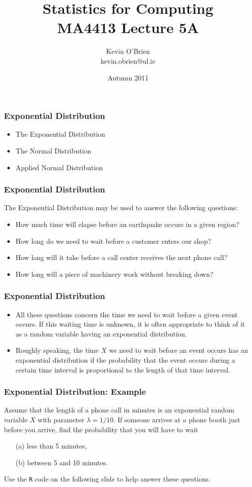 \documentclass[a4]{beamer}
\title[MA4413]{Statistics for Computing \\ {\normalsize MA4413 Lecture 5A}}
\author[Kevin O'Brien]{Kevin O'Brien \\ {\scriptsize kevin.obrien@ul.ie}}
\date{Autumn 2011}
\institute[Maths \& Stats]{Dept. of Mathematics \& Statistics, \\ University \textit{of} Limerick}
\begin{document}
\begin{frame}
\titlepage
\end{frame}
\begin{frame}[fragile]
\frametitle{Exponential Distribution}
\begin{itemize}
\item The Exponential Distribution
\item The Normal Distribution
\item Applied Normal Distribution
\end{itemize}
\end{frame}

\begin{frame}[fragile]
\frametitle{Exponential Distribution}
The Exponential Distribution may be used to answer the following questions:
\begin{itemize}
\item How much time will elapse before an earthquake occurs in a given region?
\item How long do we need to wait before a customer enters our shop?
\item How long will it take before a call center receives the next phone call?
\item How long will a piece of machinery work without breaking down?
\end{itemize}
\end{frame}  

\begin{frame}[fragile]
\frametitle{Exponential Distribution}

\begin{itemize}
\item All these questions concern the time we need to wait before a given event occurs. If this waiting time is unknown, it is often appropriate to think of it as a random variable having an exponential distribution.
\item Roughly speaking, the time $X$ we need to wait before an event occurs has an exponential distribution if the probability that the event occurs during a certain time interval is proportional to the length of that time interval.

\end{itemize}
\end{frame}

\begin{frame}[fragile]
\frametitle{Exponential Distribution: Example}
Assume that the length of a phone call in minutes is an exponential random variable $X$ with parameter
$\lambda = 1/10$. If someone arrives at a phone booth just before you arrive, find the probability that you
will have to wait \begin{itemize}
\item[(a)] less than 5 minutes,  
\item[(b)] between 5 and 10 minutes.
\end{itemize}
Use the \texttt{R} code on the following slide to help answer these questions.
\end{frame}
\end{document}
